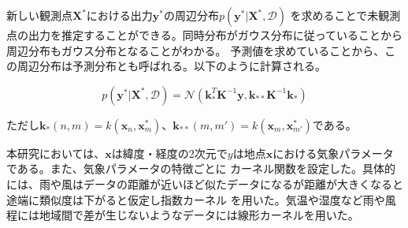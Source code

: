 新しい観測点$\boldsymbol{X}^*$における出力$\boldsymbol{y}^*$の周辺分布$p(\boldsymbol{y}^*|\boldsymbol{X}^*, \mathcal{D})$
を求めることで未観測点の出力を推定することができる。同時分布がガウス分布に従っていることから周辺分布もガウス分布となることがわかる。
予測値を求めていることから、この周辺分布は予測分布とも呼ばれる。以下のように計算される。

\begin{equation}
p(\boldsymbol{y}^*|\boldsymbol{X}^*, \mathcal{D}) = \mathcal{N}(\boldsymbol{k}_{*}^T\boldsymbol{K}^{-1}\boldsymbol{y}, \boldsymbol{k}_{**}\boldsymbol{K}^{-1}\boldsymbol{k}_{*})
\end{equation}

ただし$\boldsymbol{k}_{*}(n, m) = k(\boldsymbol{x}_{n}, \boldsymbol{x}_{m}^*)$、$\boldsymbol{k}_{**}(m, m') = k(\boldsymbol{x}_{m}, \boldsymbol{x}_{m'}^*)$である。

本研究においては、$\boldsymbol{x}$は緯度・経度の2次元で$y$は地点$\boldsymbol{x}$における気象パラメータである。また、気象パラメータの特徴ごとに
カーネル関数を設定した。具体的には、雨や風はデータの距離が近いほど似たデータになるが距離が大きくなると途端に類似度は下がると仮定し指数カーネル
を用いた。気温や湿度など雨や風程には地域間で差が生じないようなデータには線形カーネルを用いた。